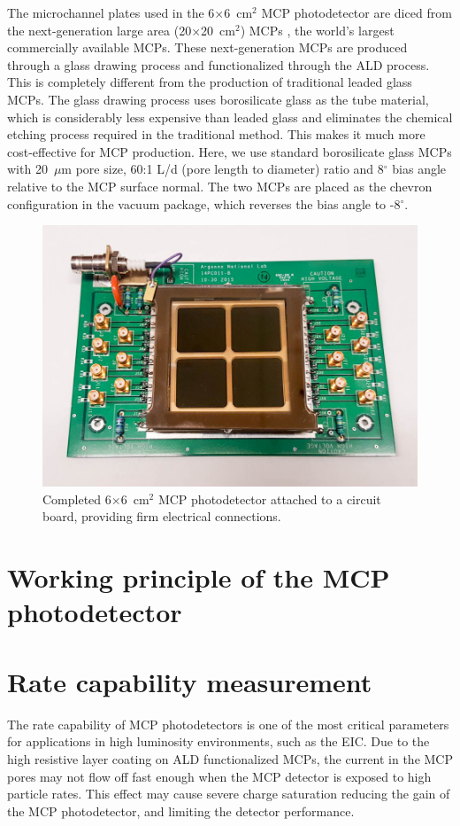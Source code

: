 \documentclass[preprint,5p]{elsarticle}
\begin{document}
The microchannel plates used in the 6$\times$6~cm$^2$ MCP photodetector are 
diced from the next-generation large area (20$\times$20~cm$^2$) MCPs 
\cite{LAPPD,Craven-MCPs}, the world's largest commercially available MCPs.  
These next-generation MCPs are produced through a glass drawing process and 
functionalized through the ALD process. This is completely different from the 
production of traditional leaded glass MCPs. The glass drawing process uses 
borosilicate glass as the tube material, which is considerably less expensive 
than leaded glass and eliminates the chemical etching process required in the 
traditional method. This makes it much more cost-effective for MCP production.  
Here, we use standard borosilicate glass MCPs with 20~$\mu$m pore size, 60:1 
L/d (pore length to diameter) ratio and 8$^{\circ}$ bias angle relative to the 
MCP surface normal. The two MCPs are placed as the chevron configuration in the 
vacuum package, which reverses the bias angle to -8$^{\circ}$. 

\begin{figure}[tbp]
\centering 
\includegraphics[scale=0.23]{fig/MCPs_assembly.png}
\caption{Completed 6$\times$6~cm$^2$ MCP photodetector attached to a circuit 
board, providing firm electrical connections.} \label{fig:MCP_assm}
\end{figure}

\section{Working principle of the MCP photodetector}


\section{Rate capability measurement} \label{sec_proton_measurements}
The rate capability of MCP photodetectors is one of the most critical 
parameters for applications in high luminosity environments, such as the EIC.  
Due to the high resistive layer coating on ALD functionalized MCPs, the current 
in the MCP pores may not flow off fast enough when the MCP detector is exposed 
to high particle rates. This effect may cause severe charge saturation reducing 
the gain of the MCP photodetector, and limiting the detector performance. 
 
\end{document}
